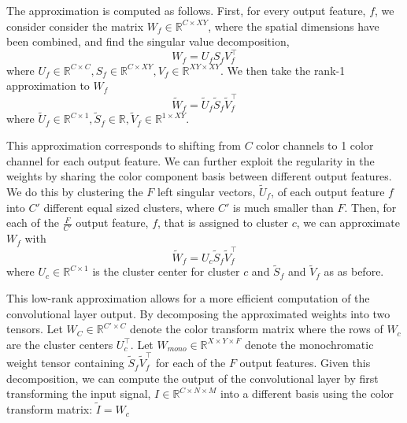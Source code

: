 The approximation is computed as follows. First, for every output feature, $f$, we consider consider the matrix $W_f \in \mathbb{R}^{C \times XY }$, where the spatial dimensions have been combined, and find the singular value decomposition, 
\begin{equation*}
	W_f = U_f S_f V_f^{\top}
\end{equation*}
where $U_f \in \mathbb{R}^{C \times C}, S_f \in \mathbb{R}^{C \times XY}, V_f \in \mathbb{R}^{XY \times XY}$. We then take the rank-1 approximation to $W_f$ 
\begin{equation*}
	\tilde{W}_f = \tilde{U}_f \tilde{S}_f \tilde{V}_f^{\top}
\end{equation*}
where $\tilde{U}_f \in \mathbb{R}^{C \times 1}, \tilde{S}_f \in \mathbb{R}, \tilde{V}_f \in \mathbb{R}^{1 \times XY}$.

This approximation corresponds to shifting from $C$ color channels to 1 color channel for each output feature. We can further exploit the regularity in the weights by sharing the color component basis between different output features. We do this by clustering the $F$ left singular vectors,  $\tilde{U}_f$, of each output feature $f$ into $C'$ different equal sized clusters, where $C'$ is much smaller than $F$. Then, for each of the $\frac{F}{C'}$ output feature, $f$, that is assigned to cluster $c$, we can approximate $W_f$ with
\begin{equation*}
	\tilde{W}_f = U_c \tilde{S}_f \tilde{V}_f^{\top}
\end{equation*}
where $U_c \in \mathbb{R}^{C \times 1}$ is the cluster center for cluster $c$ and $\tilde{S}_f$ and $\tilde{V}_f$ as as before. 

This low-rank approximation allows for a more efficient computation of the convolutional layer output. By decomposing the approximated weights into two tensors. Let $W_C \in \mathbb{R}^{C' \times C}$ denote the color transform matrix where the rows of $W_c$ are the cluster centers $U_c^{\top}$. Let $W_{mono} \in \mathbb{R}^{X \times Y \times F}$ denote the monochromatic weight tensor containing $ \tilde{S}_f \tilde{V}_f^{\top}$ for each of the $F$ output features. Given this decomposition, we can compute the output of the convolutional layer by first transforming the input signal, $I \in \mathbb{R}^{C \times N \times M}$ into a different basis using the color transform matrix: $\tilde{I} = W_c $

